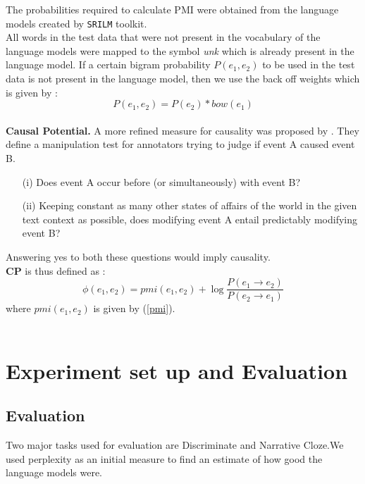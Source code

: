 \documentclass[12pt]{article}
\begin{document}
The probabilities required to calculate PMI were obtained from the language models created by \texttt{SRILM} toolkit. \\
All words in the test data that were not present in the vocabulary of the language models were mapped to the symbol \textit{unk} which is already present in the language model. If a certain bigram probability $P(e_1,e_2)$ to be used in the test data is not present in the language model, then we use the back off weights which is given by :
\begin{equation}
P(e_1,e_2) = P(e_2) * bow(e_1)
\end{equation}
\smallskip \\
{\bf Causal Potential.} A more refined measure for causality was proposed by \cite{cp}. They define a manipulation test for annotators trying to judge if event A caused event B. 
\begin{enumerate}
\item[(i)] Does event A occur before (or simultaneously) with event B?
\item[(ii)]  Keeping constant as many other states of affairs of the world in the given text context as possible, does modifying event A entail predictably modifying event B?
\end{enumerate}
Answering yes to both these questions would imply causality. \\
\textbf{CP} is thus defined as :
\begin{equation}
\phi(e_1,e_2) = pmi(e_1,e_2) + \log\frac{P(e_1 \rightarrow e_2)}{ P(e_2 \rightarrow e_1)} 
\end{equation}
where $pmi(e_1,e_2)$ is given by (\ref{pmi}). \\
\smallskip \\

\section{Experiment set up and Evaluation}
\subsection{Evaluation}
Two major tasks used for evaluation are Discriminate and Narrative Cloze.We used perplexity as an initial measure to find an estimate of how good the language models were.
\end{document}
